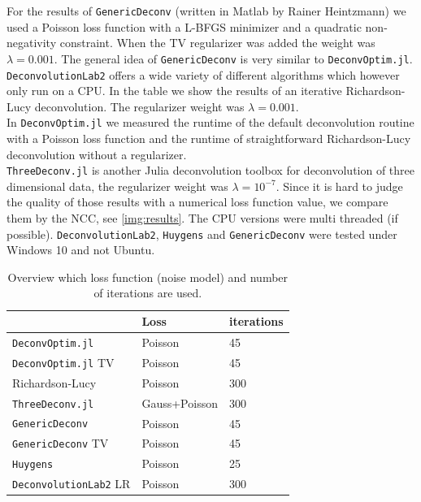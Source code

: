\documentclass{juliacon}
\begin{document}
        For the results of \verb|GenericDeconv| (written in Matlab by Rainer Heintzmann) we used a Poisson loss function with a L-BFGS minimizer 
        and a quadratic non-negativity constraint.
        When the TV regularizer was added the weight was $\lambda = 0.001$.
        The general idea of \verb|GenericDeconv| is very similar to \verb|DeconvOptim.jl|.
        \verb|DeconvolutionLab2| offers a wide variety of different algorithms which however only run on a CPU. 
        In the table we show the results of an 
        iterative Richardson-Lucy deconvolution. The regularizer weight was $\lambda=0.001$.\\
        In \verb|DeconvOptim.jl| we measured the runtime of the default deconvolution routine with a Poisson loss function
        and the runtime of straightforward Richardson-Lucy deconvolution without a regularizer.\\
        \verb|ThreeDeconv.jl| is another Julia deconvolution toolbox for deconvolution of three dimensional data, the regularizer weight was $\lambda=10^{-7}$. 
        Since it is hard to judge the quality of those results with a numerical loss function value, 
        we compare them by the NCC, see \autoref{img:results}.
        The CPU versions were multi threaded (if possible). 
        \verb|DeconvolutionLab2|, \verb|Huygens| and \verb|GenericDeconv| were tested under Windows 10 and not Ubuntu.
        \begin{table}[h]
            \begin{tabular}{l l l}
                & Loss & iterations \\ 
            \hline
            \verb|DeconvOptim.jl| & Poisson & 45 \\
            \verb|DeconvOptim.jl| TV & Poisson & 45\\
            Richardson-Lucy & Poisson & 300 \\
            \verb|ThreeDeconv.jl|  & Gauss+Poisson& 300\\
            \verb|GenericDeconv|  & Poisson & 45\\
            \verb|GenericDeconv| TV & Poisson & 45 \\
            \verb|Huygens| & Poisson & 25\\
            \verb|DeconvolutionLab2| LR & Poisson & 300\\
            \end{tabular}
            \caption{Overview which loss function (noise model) and number of iterations are used.}
            \label{tab:deconvprop}
        \end{table}
\end{document}
